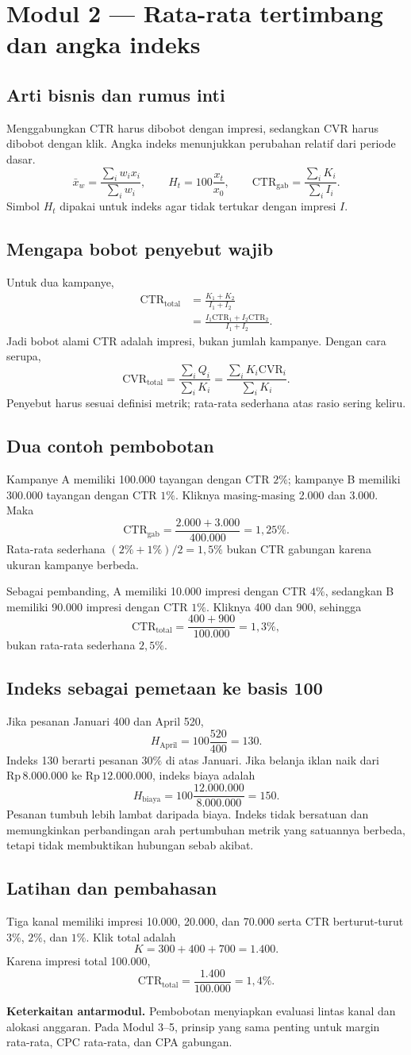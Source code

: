 \documentclass[11pt,a4paper]{article}
\newcommand{\modul}[2]{\clearpage\section{Modul #1 --- #2}}
\newcommand{\bagian}[1]{\Needspace{5\baselineskip}\subsection{#1}}
\newcommand{\jembatan}[1]{\par\textbf{Keterkaitan antarmodul.} #1\par}
\newcommand{\CTR}{\mathrm{CTR}}
\newcommand{\CVR}{\mathrm{CVR}}
\newcommand{\rp}[1]{\ensuremath{\mathrm{Rp}\,#1}}
\begin{document}
\modul{2}{Rata-rata tertimbang dan angka indeks}
\bagian{Arti bisnis dan rumus inti}
Menggabungkan CTR harus dibobot dengan impresi, sedangkan CVR harus dibobot dengan klik. Angka indeks menunjukkan perubahan relatif dari periode dasar.
\[
\bar{x}_w=\frac{\sum_i w_ix_i}{\sum_iw_i},\qquad
H_t=100\frac{x_t}{x_0},\qquad
\CTR_{\text{gab}}=\frac{\sum_iK_i}{\sum_iI_i}.
\]
Simbol \(H_t\) dipakai untuk indeks agar tidak tertukar dengan impresi \(I\).

\bagian{Mengapa bobot penyebut wajib}
Untuk dua kampanye,
\[
\begin{aligned}
\CTR_{\text{total}}
&=\frac{K_1+K_2}{I_1+I_2}\\
&=\frac{I_1\CTR_1+I_2\CTR_2}{I_1+I_2}.
\end{aligned}
\]
Jadi bobot alami CTR adalah impresi, bukan jumlah kampanye. Dengan cara serupa,
\[
\CVR_{\text{total}}=\frac{\sum_i Q_i}{\sum_i K_i}
=\frac{\sum_i K_i\CVR_i}{\sum_i K_i}.
\]
Penyebut harus sesuai definisi metrik; rata-rata sederhana atas rasio sering keliru.

\bagian{Dua contoh pembobotan}
Kampanye A memiliki 100.000 tayangan dengan CTR \(2\%\); kampanye B memiliki 300.000 tayangan dengan CTR \(1\%\). Kliknya masing-masing 2.000 dan 3.000. Maka
\[
\CTR_{\text{gab}}=\frac{2.000+3.000}{400.000}=1{,}25\%.
\]
Rata-rata sederhana \((2\%+1\%)/2=1{,}5\%\) bukan CTR gabungan karena ukuran kampanye berbeda.

Sebagai pembanding, A memiliki 10.000 impresi dengan CTR \(4\%\), sedangkan B memiliki 90.000 impresi dengan CTR \(1\%\). Kliknya 400 dan 900, sehingga
\[
\CTR_{\text{total}}=\frac{400+900}{100.000}=1{,}3\%,
\]
bukan rata-rata sederhana \(2{,}5\%\).

\bagian{Indeks sebagai pemetaan ke basis 100}
Jika pesanan Januari 400 dan April 520,
\[
H_{\text{April}}=100\frac{520}{400}=130.
\]
Indeks 130 berarti pesanan \(30\%\) di atas Januari. Jika belanja iklan naik dari \rp{8.000.000} ke \rp{12.000.000}, indeks biaya adalah
\[
H_{\text{biaya}}=100\frac{12.000.000}{8.000.000}=150.
\]
Pesanan tumbuh lebih lambat daripada biaya. Indeks tidak bersatuan dan memungkinkan perbandingan arah pertumbuhan metrik yang satuannya berbeda, tetapi tidak membuktikan hubungan sebab akibat.

\bagian{Latihan dan pembahasan}
Tiga kanal memiliki impresi 10.000, 20.000, dan 70.000 serta CTR berturut-turut \(3\%\), \(2\%\), dan \(1\%\). Klik total adalah
\[
K=300+400+700=1.400.
\]
Karena impresi total 100.000,
\[
\CTR_{\text{total}}=\frac{1.400}{100.000}=1{,}4\%.
\]
\jembatan{Pembobotan menyiapkan evaluasi lintas kanal dan alokasi anggaran. Pada Modul 3--5, prinsip yang sama penting untuk margin rata-rata, CPC rata-rata, dan CPA gabungan.}
\end{document}
